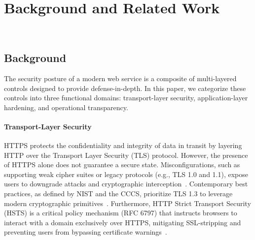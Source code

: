 \documentclass[a4paper,fleqn]{cas-sc}
\begin{document}
\section{Background and Related Work}~\label{sec:background}
    \subsection{Background}
    The security posture of a modern web service is a composite of multi-layered controls designed to provide defense-in-depth. In this paper, we categorize these controls into three functional domains: transport-layer security, application-layer hardening, and operational transparency.

    \paragraph{Transport-Layer Security}
    HTTPS protects the confidentiality and integrity of data in transit by layering HTTP over the Transport Layer Security (TLS) protocol. However, the presence of HTTPS alone does not guarantee a secure state. Misconfigurations, such as supporting weak cipher suites or legacy protocols (e.g., TLS 1.0 and 1.1), expose users to downgrade attacks and cryptographic interception~\cite{rfc8996}. Contemporary best practices, as defined by NIST and the CCCS, prioritize TLS 1.3 to leverage modern cryptographic primitives~\cite{rfc8446, nist_800_52r2, cccs-itsp-40062}. Furthermore, HTTP Strict Transport Security (HSTS) is a critical policy mechanism (RFC 6797) that instructs browsers to interact with a domain exclusively over HTTPS, mitigating SSL-stripping and preventing users from bypassing certificate warnings~\cite{rfc6797, mdn_sts_header}.
\end{document}
